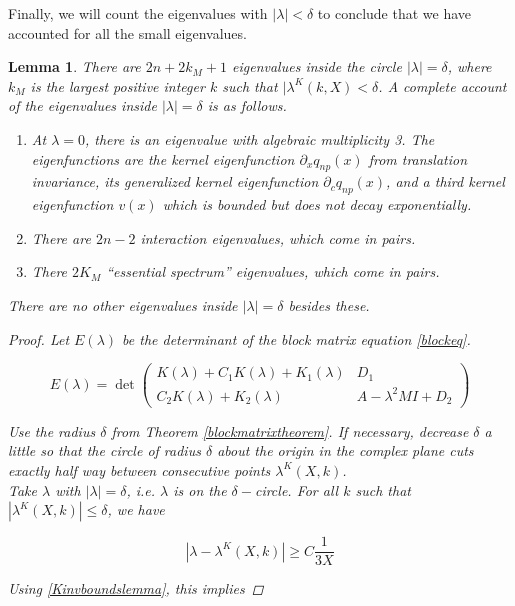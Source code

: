 \documentclass[12pt]{article}
\newtheorem{lemma}{Lemma}
\begin{document}
Finally, we will count the eigenvalues with $|\lambda| < \delta$ to conclude that we have accounted for all the small eigenvalues.  

\begin{lemma}\label{eigcount}
There are $2n + 2 k_M + 1$ eigenvalues inside the circle $|\lambda| = \delta$, where $k_M$ is the largest positive integer $k$ such that $|\lambda^K(k,X) < \delta$. A complete account of the eigenvalues inside $|\lambda| = \delta$ is as follows.
\begin{enumerate}
	\item At $\lambda = 0$, there is an eigenvalue with algebraic multiplicity 3. The eigenfunctions are the kernel eigenfunction $\partial_x q_{np}(x)$ from translation invariance, its generalized kernel eigenfunction $\partial_c q_{np}(x)$, and a third kernel eigenfunction $v(x)$ which is bounded but does not decay exponentially.
	\item There are $2n - 2$ interaction eigenvalues, which come in pairs.
	\item There $2 K_M$ ``essential spectrum'' eigenvalues, which come in pairs.
\end{enumerate}
There are no other eigenvalues inside $|\lambda| = \delta$ besides these.

\begin{proof}
Let $E(\lambda)$ be the determinant of the block matrix equation \ref{blockeq}.

\begin{equation}
E(\lambda) = \det 
\begin{pmatrix}
K(\lambda) + C_1 K(\lambda) + K_1(\lambda) & D_1 \\
C_2 K(\lambda) + K_2(\lambda) & A - \lambda^2 MI + D_2
\end{pmatrix}
\end{equation}

Use the radius $\delta$ from Theorem \ref{blockmatrixtheorem}. If necessary, decrease $\delta$ a little so that the circle of radius $\delta$ about the origin in the complex plane cuts exactly half way between consecutive points $\lambda^K(X, k)$.\\

Take $\lambda$ with $|\lambda| = \delta$, i.e. $\lambda$ is on the $\delta-$circle. For all $k$ such that $|\lambda^K(X, k)| \leq \delta$, we have

\[
| \lambda - \lambda^K(X, k)|  \geq C \frac{1}{3X}
\]

Using \ref{Kinvboundslemma}, this implies


\end{proof}
\end{lemma}
\end{document}
